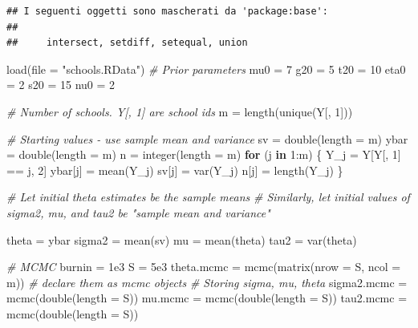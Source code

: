 \documentclass[
  11pt,
]{article}
\newenvironment{Shaded}{\begin{snugshade}}{\end{snugshade}}
\newcommand{\AttributeTok}[1]{\textcolor[rgb]{0.77,0.63,0.00}{#1}}
\newcommand{\CommentTok}[1]{\textcolor[rgb]{0.56,0.35,0.01}{\textit{#1}}}
\newcommand{\ControlFlowTok}[1]{\textcolor[rgb]{0.13,0.29,0.53}{\textbf{#1}}}
\newcommand{\DecValTok}[1]{\textcolor[rgb]{0.00,0.00,0.81}{#1}}
\newcommand{\FloatTok}[1]{\textcolor[rgb]{0.00,0.00,0.81}{#1}}
\newcommand{\FunctionTok}[1]{\textcolor[rgb]{0.00,0.00,0.00}{#1}}
\newcommand{\NormalTok}[1]{#1}
\newcommand{\OtherTok}[1]{\textcolor[rgb]{0.56,0.35,0.01}{#1}}
\newcommand{\SpecialCharTok}[1]{\textcolor[rgb]{0.00,0.00,0.00}{#1}}
\newcommand{\StringTok}[1]{\textcolor[rgb]{0.31,0.60,0.02}{#1}}
\begin{document}
\begin{verbatim}
## I seguenti oggetti sono mascherati da 'package:base':
## 
##     intersect, setdiff, setequal, union
\end{verbatim}

\begin{Shaded}
\begin{Highlighting}[]
\FunctionTok{load}\NormalTok{(}\AttributeTok{file =} \StringTok{"schools.RData"}\NormalTok{)}
\CommentTok{\# Prior parameters}
\NormalTok{mu0 }\OtherTok{=} \DecValTok{7}
\NormalTok{g20 }\OtherTok{=} \DecValTok{5}
\NormalTok{t20 }\OtherTok{=} \DecValTok{10}
\NormalTok{eta0 }\OtherTok{=} \DecValTok{2}
\NormalTok{s20 }\OtherTok{=} \DecValTok{15}
\NormalTok{nu0 }\OtherTok{=} \DecValTok{2}

\CommentTok{\# Number of schools. Y[, 1] are school ids}
\NormalTok{m }\OtherTok{=} \FunctionTok{length}\NormalTok{(}\FunctionTok{unique}\NormalTok{(Y[, }\DecValTok{1}\NormalTok{]))}

\CommentTok{\# Starting values {-} use sample mean and variance}
\NormalTok{sv }\OtherTok{=} \FunctionTok{double}\NormalTok{(}\AttributeTok{length =}\NormalTok{ m)}
\NormalTok{ybar }\OtherTok{=} \FunctionTok{double}\NormalTok{(}\AttributeTok{length =}\NormalTok{ m)}
\NormalTok{n }\OtherTok{=} \FunctionTok{integer}\NormalTok{(}\AttributeTok{length =}\NormalTok{ m)}
\ControlFlowTok{for}\NormalTok{ (j }\ControlFlowTok{in} \DecValTok{1}\SpecialCharTok{:}\NormalTok{m) \{}
\NormalTok{  Y\_j }\OtherTok{=}\NormalTok{ Y[Y[, }\DecValTok{1}\NormalTok{] }\SpecialCharTok{==}\NormalTok{ j, }\DecValTok{2}\NormalTok{]}
\NormalTok{  ybar[j] }\OtherTok{=} \FunctionTok{mean}\NormalTok{(Y\_j)}
\NormalTok{  sv[j] }\OtherTok{=} \FunctionTok{var}\NormalTok{(Y\_j)}
\NormalTok{  n[j] }\OtherTok{=} \FunctionTok{length}\NormalTok{(Y\_j)}
\NormalTok{\}}

\CommentTok{\# Let initial theta estimates be the sample means}
\CommentTok{\# Similarly, let initial values of sigma2, mu, and tau2 be "sample mean and variance"}

\NormalTok{theta }\OtherTok{=}\NormalTok{ ybar}
\NormalTok{sigma2 }\OtherTok{=} \FunctionTok{mean}\NormalTok{(sv)}
\NormalTok{mu }\OtherTok{=} \FunctionTok{mean}\NormalTok{(theta)}
\NormalTok{tau2 }\OtherTok{=} \FunctionTok{var}\NormalTok{(theta)}

\CommentTok{\# MCMC}
\NormalTok{burnin }\OtherTok{=} \FloatTok{1e3}
\NormalTok{S }\OtherTok{=} \FloatTok{5e3}
\NormalTok{theta.mcmc }\OtherTok{=} \FunctionTok{mcmc}\NormalTok{(}\FunctionTok{matrix}\NormalTok{(}\AttributeTok{nrow =}\NormalTok{ S, }\AttributeTok{ncol =}\NormalTok{ m)) }\CommentTok{\# declare them as mcmc objects}
\CommentTok{\# Storing sigma, mu, theta}
\NormalTok{sigma2.mcmc }\OtherTok{=} \FunctionTok{mcmc}\NormalTok{(}\FunctionTok{double}\NormalTok{(}\AttributeTok{length =}\NormalTok{ S))}
\NormalTok{mu.mcmc }\OtherTok{=} \FunctionTok{mcmc}\NormalTok{(}\FunctionTok{double}\NormalTok{(}\AttributeTok{length =}\NormalTok{ S))}
\NormalTok{tau2.mcmc }\OtherTok{=} \FunctionTok{mcmc}\NormalTok{(}\FunctionTok{double}\NormalTok{(}\AttributeTok{length =}\NormalTok{ S))}


\end{Highlighting}
\end{Shaded}
\end{document}
